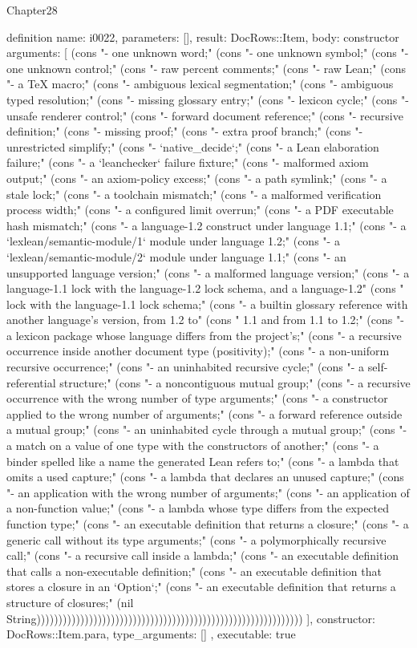 \begin{lexlean}{Chapter28}
\begin{semanticmodule}
definition{
  name: i0022,
  parameters: [],
  result: DocRows::Item,
  body: constructor{
    arguments: [
      (cons "- one unknown word;" (cons "- one unknown symbol;" (cons "- one unknown control;" (cons "- raw percent comments;" (cons "- raw Lean;" (cons "- a TeX macro;" (cons "- ambiguous lexical segmentation;" (cons "- ambiguous typed resolution;" (cons "- missing glossary entry;" (cons "- lexicon cycle;" (cons "- unsafe renderer control;" (cons "- forward document reference;" (cons "- recursive definition;" (cons "- missing proof;" (cons "- extra proof branch;" (cons "- unrestricted simplify;" (cons "- `native_decide`;" (cons "- a Lean elaboration failure;" (cons "- a `leanchecker` failure fixture;" (cons "- malformed axiom output;" (cons "- an axiom-policy excess;" (cons "- a path symlink;" (cons "- a stale lock;" (cons "- a toolchain mismatch;" (cons "- a malformed verification process width;" (cons "- a configured limit overrun;" (cons "- a PDF executable hash mismatch;" (cons "- a language-1.2 construct under language 1.1;" (cons "- a `lexlean/semantic-module/1` module under language 1.2;" (cons "- a `lexlean/semantic-module/2` module under language 1.1;" (cons "- an unsupported language version;" (cons "- a malformed language version;" (cons "- a language-1.1 lock with the language-1.2 lock schema, and a language-1.2" (cons "  lock with the language-1.1 lock schema;" (cons "- a builtin glossary reference with another language's version, from 1.2 to" (cons "  1.1 and from 1.1 to 1.2;" (cons "- a lexicon package whose language differs from the project's;" (cons "- a recursive occurrence inside another document type (positivity);" (cons "- a non-uniform recursive occurrence;" (cons "- an uninhabited recursive cycle;" (cons "- a self-referential structure;" (cons "- a noncontiguous mutual group;" (cons "- a recursive occurrence with the wrong number of type arguments;" (cons "- a constructor applied to the wrong number of arguments;" (cons "- a forward reference outside a mutual group;" (cons "- an uninhabited cycle through a mutual group;" (cons "- a match on a value of one type with the constructors of another;" (cons "- a binder spelled like a name the generated Lean refers to;" (cons "- a lambda that omits a used capture;" (cons "- a lambda that declares an unused capture;" (cons "- an application with the wrong number of arguments;" (cons "- an application of a non-function value;" (cons "- a lambda whose type differs from the expected function type;" (cons "- an executable definition that returns a closure;" (cons "- a generic call without its type arguments;" (cons "- a polymorphically recursive call;" (cons "- a recursive call inside a lambda;" (cons "- an executable definition that calls a non-executable definition;" (cons "- an executable definition that stores a closure in an `Option`;" (cons "- an executable definition that returns a structure of closures;" (nil String)))))))))))))))))))))))))))))))))))))))))))))))))))))))))))))
    ],
    constructor: DocRows::Item.para,
    type_arguments: []
  },
  executable: true
}


\end{semanticmodule}
\end{lexlean}
